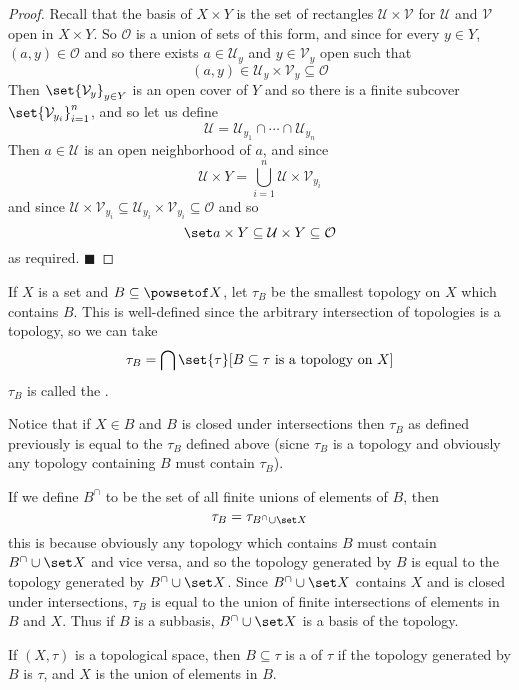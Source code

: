 \documentclass[10pt]{article}
\def\qed{\hskip1cm\penalty-100\hbox{}\hfill$\blacksquare$}
\def\mU{\mathcal{U}}
\def\mV{\mathcal{V}}
\def\mO{\mathcal{O}}
\begin{document}
\begin{proof}

    Recall that the basis of $X\times Y$ is the set of rectangles $\mU\times\mV$ for $\mU$ and $\mV$ open in $X\times Y$.
    So $\mO$ is a union of sets of this form, and since for every $y\in Y$, $(a,y)\in\mO$ and so there exists $a\in\mU_y$ and $y\in\mV_y$ open such that
    \[ (a,y) \in \mU_y\times\mV_y \subseteq \mO \]
    Then $\set{\mV_y}_{y\in Y}$ is an open cover of $Y$ and so there is a finite subcover $\set{\mV_{y_i}}_{i=1}^n$, and so let us define
    \[ \mU = \mU_{y_1}\cap\cdots\cap\mU_{y_n} \]
    Then $a\in\mU$ is an open neighborhood of $a$, and since
    \[ \mU\times Y = \bigcup_{i=1}^n\mU\times\mV_{y_i} \]
    and since $\mU\times\mV_{y_i}\subseteq\mU_{y_i}\times\mV_{y_i}\subseteq\mO$ and so
    \[ \set a\times Y\subseteq\mU\times Y\subseteq\mO \]
    as required.
    \qed

\end{proof}

\begin{defn*}

    If $X$ is a set and $B\subseteq\powsetof X$, let $\tau_B$ be the smallest topology on $X$ which contains $B$.
    This is well-defined since the arbitrary intersection of topologies is a topology, so we can take
    \[ \tau_B = \bigcap\set{\tau}[B\subseteq\tau\text{ is a topology on }X] \]
    $\tau_B$ is called the .

\end{defn*}

Notice that if $X\in B$ and $B$ is closed under intersections then $\tau_B$ as defined previously is equal to the $\tau_B$ defined above (sicne $\tau_B$ is a topology and obviously any topology containing
$B$ must contain $\tau_B$).

If we define $B^\cap$ to be the set of all finite unions of elements of $B$, then
\[ \tau_B = \tau_{B^\cap\cup\set X} \]
this is because obviously any topology which contains $B$ must contain $B^\cap\cup\set X$ and vice versa, and so the topology generated by $B$ is equal to the topology generated by $B^\cap\cup\set X$.
Since $B^\cap\cup\set X$ contains $X$ and is closed under intersections, $\tau_B$ is equal to the union of finite intersections of elements in $B$ and $X$.
Thus if $B$ is a subbasis, $B^\cap\cup\set X$ is a basis of the topology.

\begin{defn*}

    If $(X,\tau)$ is a topological space, then $B\subseteq\tau$ is a  of $\tau$ if the topology generated by $B$ is $\tau$, and $X$ is the union of elements in $B$.

\end{defn*}
\end{document}
